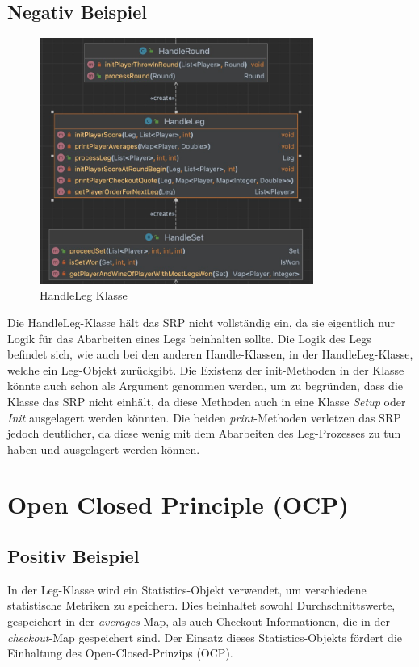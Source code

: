 \subsection{Negativ Beispiel}
\begin{figure}[ht]
    \centering
    \includegraphics[width=0.8\textwidth]{Bilder/HandleLeg.png}
    \caption{HandleLeg Klasse}
    \label{fig:handleLeg-uml}
\end{figure}
Die HandleLeg-Klasse hält das SRP nicht vollständig ein, da sie eigentlich nur Logik für das Abarbeiten eines Legs beinhalten sollte. Die Logik des Legs befindet sich, wie auch bei den anderen Handle-Klassen, in der HandleLeg-Klasse, welche ein Leg-Objekt zurückgibt. Die Existenz der init-Methoden in der Klasse könnte auch schon als Argument genommen werden, um zu begründen, dass die Klasse das SRP nicht einhält, da diese Methoden auch in eine Klasse \textit{Setup} oder \textit{Init} ausgelagert werden könnten. Die beiden \textit{print}-Methoden verletzen das SRP jedoch deutlicher, da diese wenig mit dem Abarbeiten des Leg-Prozesses zu tun haben und ausgelagert werden können.
\section{Open Closed Principle (OCP)}

\subsection{Positiv Beispiel}
In der Leg-Klasse wird ein Statistics-Objekt verwendet, um verschiedene statistische Metriken zu speichern. Dies beinhaltet sowohl Durchschnittswerte, gespeichert in der \textit{averages}-Map, als auch Checkout-Informationen, die in der \textit{checkout}-Map gespeichert sind. Der Einsatz dieses Statistics-Objekts fördert die Einhaltung des Open-Closed-Prinzips (OCP).\\

